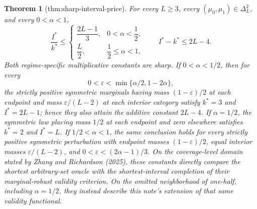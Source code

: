 \documentclass{article}
\newtheorem{theorem}{Theorem}
\begin{document}
\begin{theorem}[thm:sharp-interval-price]\label{thm:sharp-interval-price}
For every \(L\geq3\), every \((\mu_0,\mu_1)\in\Delta_L^2\), and every \(0<\alpha<1\),
\[
\frac{I^*}{k^*}\leq
\begin{cases}
\dfrac{2L-1}{3},&0<\alpha<\dfrac12,\\[3pt]
\dfrac L2,&\dfrac12\leq\alpha<1,
\end{cases}
\qquad
I^*-k^*\leq2L-4.
\]
Both regime-specific multiplicative constants are sharp.  If \(0<\alpha<1/2\), then for every
\[
0<\varepsilon<\min\{\alpha/2,1-2\alpha\},
\]
the strictly positive symmetric marginals having mass \((1-\varepsilon)/2\) at each endpoint and mass \(\varepsilon/(L-2)\) at each interior category satisfy \(k^*=3\) and \(I^*=2L-1\); hence they also attain the additive constant \(2L-4\).  If \(\alpha=1/2\), the symmetric law placing mass \(1/2\) at each endpoint and zero elsewhere satisfies \(k^*=2\) and \(I^*=L\).  If \(1/2<\alpha<1\), the same conclusion holds for every strictly positive symmetric perturbation with endpoint masses \((1-\varepsilon)/2\), equal interior masses \(\varepsilon/(L-2)\), and \(0<\varepsilon<(2\alpha-1)/3\).  On the coverage-level domain stated by Zhang and Richardson (2025), these constants directly compare the shortest arbitrary-set oracle with the shortest-interval completion of their marginal-robust validity criterion.  On the omitted neighborhood of one-half, including \(\alpha=1/2\), they instead describe this note's extension of that same validity functional.
\end{theorem}
\end{document}
